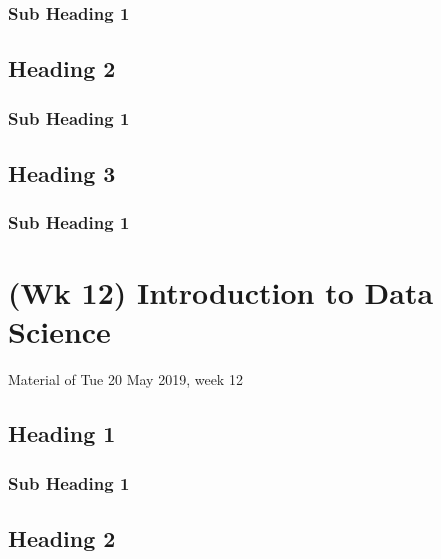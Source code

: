 \documentclass[]{book}
\begin{document}
\hypertarget{sub-heading-1-24}{%
\subsection{Sub Heading 1}\label{sub-heading-1-24}}

\hypertarget{heading-2-8}{%
\section{Heading 2}\label{heading-2-8}}

\hypertarget{sub-heading-1-25}{%
\subsection{Sub Heading 1}\label{sub-heading-1-25}}

\hypertarget{heading-3-8}{%
\section{Heading 3}\label{heading-3-8}}

\hypertarget{sub-heading-1-26}{%
\subsection{Sub Heading 1}\label{sub-heading-1-26}}

\hypertarget{wk-12-introduction-to-data-science}{%
\chapter{(Wk 12) Introduction to Data Science}\label{wk-12-introduction-to-data-science}}

Material of Tue 20 May 2019, week 12

\hypertarget{heading-1-9}{%
\section{Heading 1}\label{heading-1-9}}

\hypertarget{sub-heading-1-27}{%
\subsection{Sub Heading 1}\label{sub-heading-1-27}}

\hypertarget{heading-2-9}{%
\section{Heading 2}\label{heading-2-9}}
\end{document}
